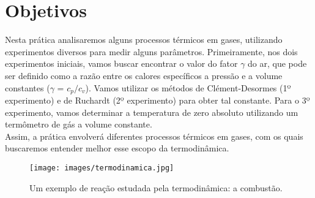 \newpage
\section{Objetivos}

Nesta prática analisaremos alguns processos térmicos em gases, utilizando experimentos diversos para medir alguns parâmetros. Primeiramente, nos dois experimentos iniciais, vamos buscar encontrar o valor do fator $\gamma$ do ar, que pode ser definido como a razão entre os calores específicos a pressão e a volume constantes ($\gamma$ = $c_p/c_v$). Vamos utilizar os métodos de Clément-Desormes (1º experimento) e de Ruchardt (2º experimento) para obter tal constante. Para o 3º experimento, vamos determinar a temperatura de zero absoluto utilizando um termômetro de gás a volume constante.\\

Assim, a prática envolverá diferentes processos térmicos em gases, com os quais buscaremos entender melhor esse escopo da termodinâmica.\\

\begin{figure}[H]
  \centering
  \texttt{[image: images/termodinamica.jpg]}
  \caption{Um exemplo de reação estudada pela termodinâmica: a combustão.}
\end{figure}
